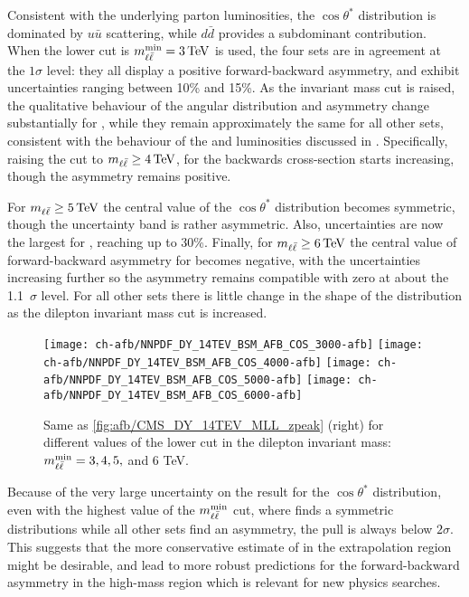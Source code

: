  Consistent with the underlying parton luminosities, the $\cos\theta^*$ distribution
 is dominated by $u\bar{u}$ scattering, while  $d\bar{d}$ provides
 a subdominant contribution.
 When the lower cut  is $\mll^{\text{min}}=\SI{3}{\tera\electronvolt}$ is used, the four \pdf
 sets are in agreement at the $1\sigma$ level: they all
 display a 
 positive forward-backward asymmetry, and exhibit \pdf uncertainties ranging between 10\% and 15\%.
 As the invariant mass cut is raised, the qualitative behaviour of the
 angular distribution and
 asymmetry change substantially for , while they remain
 approximately the same for all other \pdf sets, consistent with the
 behaviour of the \pdfs and luminosities discussed in
 .
%
 Specifically,
 raising the cut to
 $\mll \ge \SI{4}{\tera\electronvolt}$, for 
 the backwards cross-section starts increasing, though the asymmetry remains
positive.

For $\mll\ge \SI{5}{\tera\electronvolt}$ the central value of the  $\cos\theta^*$
 distribution  becomes symmetric, though the  \pdf uncertainty band is
 rather asymmetric. Also, \pdf uncertainties
 are now the largest for , reaching up to 30\%.
 Finally, for $\mll\ge \SI{6}{\tera\electronvolt}$  the central value of 
 forward-backward asymmetry for  becomes negative, with the
 \pdf uncertainties increasing further so the asymmetry remains compatible
 with zero at about the 1.1~$\sigma$ level.
 For all other \pdf sets there is little change in the shape of the distribution as the
 dilepton invariant mass cut is increased.

\begin{figure}[t!]
 \centering
 \texttt{[image: ch-afb/NNPDF\_DY\_14TEV\_BSM\_AFB\_COS\_3000-afb]}
 \texttt{[image: ch-afb/NNPDF\_DY\_14TEV\_BSM\_AFB\_COS\_4000-afb]}
 \texttt{[image: ch-afb/NNPDF\_DY\_14TEV\_BSM\_AFB\_COS\_5000-afb]}
 \texttt{[image: ch-afb/NNPDF\_DY\_14TEV\_BSM\_AFB\_COS\_6000-afb]}
 \caption{Same as \cref{fig:afb/CMS_DY_14TEV_MLL_zpeak} (right)
   for different values of the  lower cut in the dilepton
   invariant mass: $m_{\ell\bar{\ell}}^{\text{min}}=3, 4,5,$ and 6 TeV.
  }    
 \label{fig:afb/CMS_DY_14TEV_MLL_others_asy}
\end{figure}

Because of the very large uncertainty on the  result for the $\cos\theta^*$
distribution, even with
the highest value of the  $m_{\ell\bar{\ell}}^{\text{min}}$ cut, where  finds a
symmetric distributions while all other \pdf sets find an asymmetry,
the pull is always below $2 \sigma$.
%
This suggests that the more
conservative estimate of   in the extrapolation region might be
desirable, and lead to more robust predictions for the
forward-backward asymmetry in the high-mass region which is relevant
for new physics searches.
